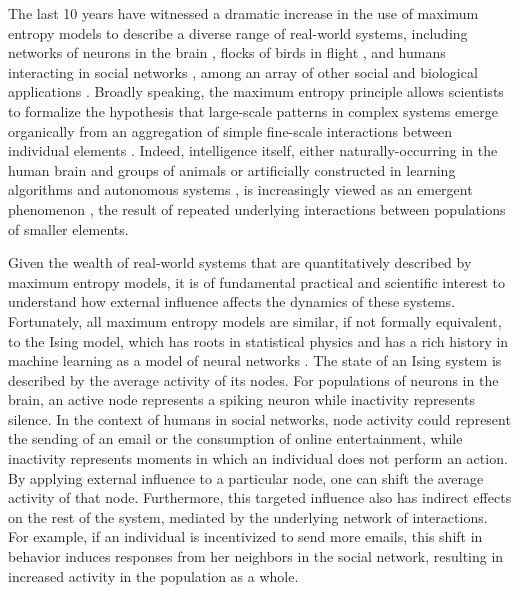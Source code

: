 \documentclass[letterpaper]{article} %
\begin{document}
The last 10 years have witnessed a dramatic increase in the use of maximum entropy models to describe a diverse range of real-world systems, including networks of neurons in the brain \cite{Schneidman-01,Ganmor-01}, flocks of birds in flight \cite{Bialek-01}, and humans interacting in social networks \cite{Lynn-03,Galam-02}, among an array of other social and biological applications \cite{Kapur-01,Phillips-01,Mora-01,Lezon-01}. Broadly speaking, the maximum entropy principle allows scientists to formalize the hypothesis that large-scale patterns in complex systems emerge organically from an aggregation of simple fine-scale interactions between individual elements \cite{Jaynes-01}. Indeed, intelligence itself, either naturally-occurring in the human brain and groups of animals \cite{Hillis-01} or artificially constructed in learning algorithms and autonomous systems \cite{Mataric-01,Namatame-01}, is increasingly viewed as an emergent phenomenon \cite{Levy-01}, the result of repeated underlying interactions between populations of smaller elements.

Given the wealth of real-world systems that are quantitatively described by maximum entropy models, it is of fundamental practical and scientific interest to understand how external influence affects the dynamics of these systems. Fortunately, all maximum entropy models are similar, if not formally equivalent, to the Ising model, which has roots in statistical physics \cite{Brush-01} and has a rich history in machine learning as a model of neural networks \cite{Coughlin-01}. The state of an Ising system is described by the average activity of its nodes. For populations of neurons in the brain, an active node represents a spiking neuron while inactivity represents silence. In the context of humans in social networks, node activity could represent the sending of an email or the consumption of online entertainment, while inactivity represents moments in which an individual does not perform an action. By applying external influence to a particular node, one can shift the average activity of that node. Furthermore, this targeted influence also has indirect effects on the rest of the system, mediated by the underlying network of interactions. For example, if an individual is incentivized to send more emails, this shift in behavior induces responses from her neighbors in the social network, resulting in increased activity in the population as a whole.
\end{document}
